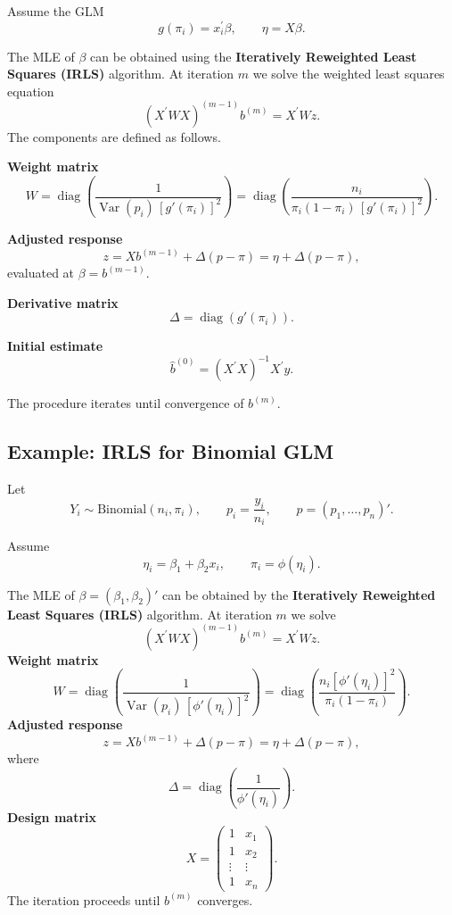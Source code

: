 \documentclass[11pt]{article}
\theoremstyle{definition}
\begin{document}
Assume the GLM
\[
g(\pi_i)=x_i^\prime \beta, \qquad
\eta = X\beta .
\]

The MLE of $\beta$ can be obtained using the
\textbf{Iteratively Reweighted Least Squares (IRLS)} algorithm.
At iteration $m$ we solve the weighted least squares equation
\[
(X^\prime W X)^{(m-1)} b^{(m)} = X^\prime W z .
\]
The components are defined as follows.

\textbf{Weight matrix}
\[
W
=
\operatorname{diag}\!\left(
\frac{1}{\operatorname{Var}(p_i)\,[g'(\pi_i)]^2}
\right)
=
\operatorname{diag}\!\left(
\frac{n_i}{\pi_i(1-\pi_i)\,[g'(\pi_i)]^2}
\right).
\]

\textbf{Adjusted response}
\[
z
=
X b^{(m-1)}
+
\Delta (p-\pi)
=
\eta + \Delta (p-\pi),
\]
evaluated at $\beta=b^{(m-1)}$.

\textbf{Derivative matrix}
\[
\Delta = \operatorname{diag}\!\left(g'(\pi_i)\right).
\]

\textbf{Initial estimate}
\[
\hat b^{(0)} = (X^\prime X)^{-1}X^\prime y .
\]

The procedure iterates until convergence of $b^{(m)}$.

\subsection*{Example: IRLS for Binomial GLM}
Let
\[
Y_i \sim \text{Binomial}(n_i,\pi_i), 
\qquad 
p_i=\frac{y_i}{n_i},
\qquad 
p=(p_1,\dots,p_n)' .
\]

Assume
\[
\eta_i = \beta_1 + \beta_2 x_i,
\qquad 
\pi_i = \phi(\eta_i).
\]

The MLE of $\beta=(\beta_1,\beta_2)'$ can be obtained by the
\textbf{Iteratively Reweighted Least Squares (IRLS)} algorithm.
At iteration $m$ we solve
\[
(X^\prime W X)^{(m-1)} b^{(m)} = X^\prime W z .
\]
\textbf{Weight matrix}
\[
W
=
\operatorname{diag}\!\left(
\frac{1}{\operatorname{Var}(p_i)\,[\phi'(\eta_i)]^2}
\right)
=
\operatorname{diag}\!\left(
\frac{n_i[\phi'(\eta_i)]^2}{\pi_i(1-\pi_i)}
\right).
\]
\textbf{Adjusted response}
\[
z
=
X b^{(m-1)}
+
\Delta (p-\pi)
=
\eta + \Delta (p-\pi),
\]
where
\[
\Delta
=
\operatorname{diag}\!\left(
\frac{1}{\phi'(\eta_i)}
\right).
\]
\textbf{Design matrix}
\[
X=
\begin{pmatrix}
1 & x_1\\
1 & x_2\\
\vdots & \vdots\\
1 & x_n
\end{pmatrix}.
\]
The iteration proceeds until $b^{(m)}$ converges.
\end{document}
